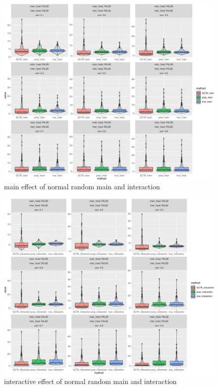 \documentclass[]{article}
\begin{document}
\begin{figure}
\centering
\includegraphics{Simulation_report_files/figure-latex/main_random_random_normal-1.pdf}
\caption{main effect of normal random main and interaction}
\end{figure}

\begin{figure}
\centering
\includegraphics{Simulation_report_files/figure-latex/inter_random_random_normal-1.pdf}
\caption{interactive effect of normal random main and interaction}
\end{figure}
\end{document}
